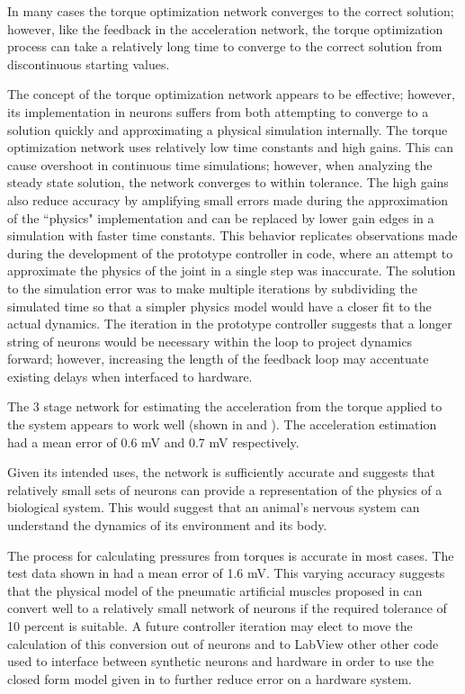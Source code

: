 
In many cases the torque optimization network converges to the
correct solution; however, like the feedback in the acceleration network, the torque optimization process can
take a relatively long time to converge to the correct solution from discontinuous starting
values.

The concept of the torque optimization network appears to be effective; however,
its implementation in neurons suffers from both attempting to converge to a
solution quickly and approximating a physical simulation internally. The torque optimization network
uses relatively low time constants and high gains. This can cause overshoot in continuous time simulations; however,
when analyzing the steady state solution, the network converges to within tolerance.
The high gains also reduce accuracy by amplifying small errors made during the
approximation of the ``physics" implementation and can be replaced by lower gain edges in a simulation with faster time constants.
This behavior replicates
observations made during the development of the prototype controller in code,
where an attempt to approximate the physics of the joint in a single step was
inaccurate. The solution to the simulation error was to make multiple iterations by subdividing
the simulated time so that a simpler physics model would have a closer fit to
the actual dynamics. The iteration in the prototype controller suggests that a longer string of neurons would be
necessary within the loop to project dynamics forward; however, increasing the length of the feedback loop may accentuate existing delays when interfaced to hardware.


The 3 stage network for estimating the acceleration from the torque applied to
the system appears to work well (shown in  and ). The acceleration estimation had a mean error of 
0.6 mV and 0.7 mV respectively.

Given its intended uses, the network is sufficiently accurate and suggests that
relatively small sets of neurons can provide a representation of the physics of
a biological system. This would suggest that an animal's nervous system can understand the dynamics of its environment and its body.


The process for calculating pressures from torques is accurate in most cases. The test data shown in  had a mean error of 1.6 mV. This varying accuracy suggests that the physical
model of the pneumatic artificial muscles proposed in \cite{HuntPMuscles}
can convert well to a relatively small network of neurons if the required tolerance of 10 percent is suitable.
A future controller iteration may elect to move the
calculation of this conversion out of neurons and
to LabView other other code used to interface between synthetic neurons and
hardware in order to use the closed form model given in \cite{HuntPMuscles} to further reduce error on a hardware system.

